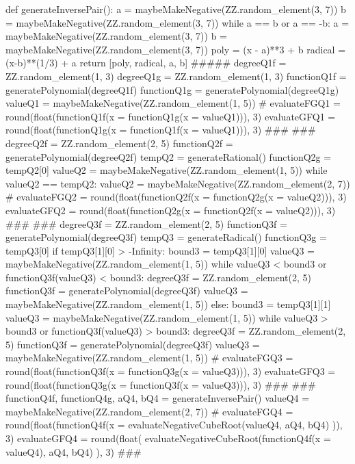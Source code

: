 \documentclass{ximera}
\begin{document}
\begin{sagesilent}
def generateInversePair():
    a = maybeMakeNegative(ZZ.random_element(3, 7))
    b = maybeMakeNegative(ZZ.random_element(3, 7))
    while a == b or a == -b:
        a = maybeMakeNegative(ZZ.random_element(3, 7))
        b = maybeMakeNegative(ZZ.random_element(3, 7))
    poly = (x - a)**3 + b
    radical = (x-b)**(1/3) + a
    return [poly, radical, a, b]
#####
degreeQ1f = ZZ.random_element(1, 3)
degreeQ1g = ZZ.random_element(1, 3)
functionQ1f = generatePolynomial(degreeQ1f)
functionQ1g = generatePolynomial(degreeQ1g)
valueQ1 = maybeMakeNegative(ZZ.random_element(1, 5))
#
evaluateFGQ1 = round(float(functionQ1f(x = functionQ1g(x = valueQ1))), 3)
evaluateGFQ1 = round(float(functionQ1g(x = functionQ1f(x = valueQ1))), 3)
###
###
degreeQ2f = ZZ.random_element(2, 5)
functionQ2f = generatePolynomial(degreeQ2f)
tempQ2 = generateRational()
functionQ2g = tempQ2[0]
valueQ2 = maybeMakeNegative(ZZ.random_element(1, 5))
while valueQ2 == tempQ2:
    valueQ2 = maybeMakeNegative(ZZ.random_element(2, 7))
#
evaluateFGQ2 = round(float(functionQ2f(x = functionQ2g(x = valueQ2))), 3)
evaluateGFQ2 = round(float(functionQ2g(x = functionQ2f(x = valueQ2))), 3)
###
###
degreeQ3f = ZZ.random_element(2, 5)
functionQ3f = generatePolynomial(degreeQ3f)
tempQ3 = generateRadical()
functionQ3g = tempQ3[0]
if tempQ3[1][0] > -Infinity:
    bound3 = tempQ3[1][0]
    valueQ3 = maybeMakeNegative(ZZ.random_element(1, 5))
    while valueQ3 < bound3 or functionQ3f(valueQ3) < bound3:
        degreeQ3f = ZZ.random_element(2, 5)
        functionQ3f = generatePolynomial(degreeQ3f)
        valueQ3 = maybeMakeNegative(ZZ.random_element(1, 5))
else:
    bound3 = tempQ3[1][1]
    valueQ3 = maybeMakeNegative(ZZ.random_element(1, 5))
    while valueQ3 > bound3 or functionQ3f(valueQ3) > bound3:
        degreeQ3f = ZZ.random_element(2, 5)
        functionQ3f = generatePolynomial(degreeQ3f)
        valueQ3 = maybeMakeNegative(ZZ.random_element(1, 5))
#
evaluateFGQ3 = round(float(functionQ3f(x = functionQ3g(x = valueQ3))), 3)
evaluateGFQ3 = round(float(functionQ3g(x = functionQ3f(x = valueQ3))), 3)
###
###
functionQ4f, functionQ4g, aQ4, bQ4 = generateInversePair()
valueQ4 = maybeMakeNegative(ZZ.random_element(2, 7))
#
evaluateFGQ4 = round(float(functionQ4f(x = evaluateNegativeCubeRoot(valueQ4, aQ4, bQ4) )), 3)
evaluateGFQ4 = round(float( evaluateNegativeCubeRoot(functionQ4f(x = valueQ4), aQ4, bQ4) ), 3)
###
 
 
 
\end{sagesilent}
 
\end{document}

